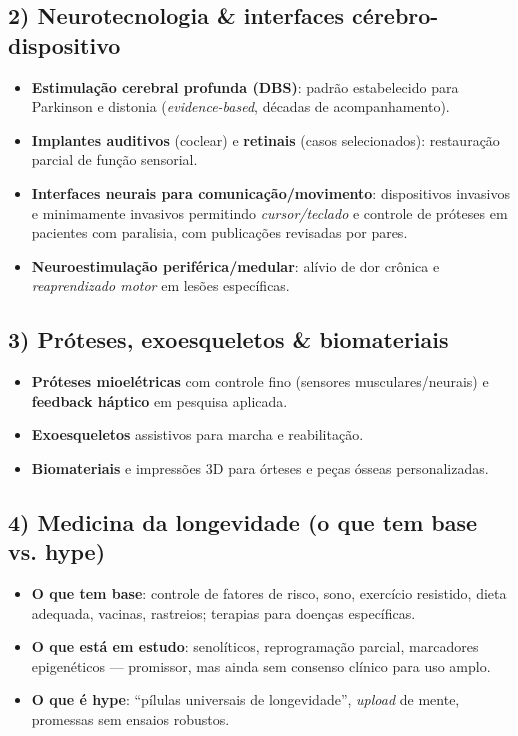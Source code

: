 \subsection*{2) Neurotecnologia \& interfaces cérebro-dispositivo}
\begin{itemize}[leftmargin=*,noitemsep]
  \item \textbf{Estimulação cerebral profunda (DBS)}: padrão estabelecido para Parkinson e distonia (\emph{evidence-based}, décadas de acompanhamento).
  \item \textbf{Implantes auditivos} (coclear) e \textbf{retinais} (casos selecionados): restauração parcial de função sensorial.
  \item \textbf{Interfaces neurais para comunicação/movimento}: dispositivos invasivos e minimamente invasivos permitindo \emph{cursor/teclado} e controle de próteses em pacientes com paralisia, com publicações revisadas por pares.
  \item \textbf{Neuroestimulação periférica/medular}: alívio de dor crônica e \emph{reaprendizado motor} em lesões específicas.
\end{itemize}

\subsection*{3) Próteses, exoesqueletos \& biomateriais}
\begin{itemize}[leftmargin=*,noitemsep]
  \item \textbf{Próteses mioelétricas} com controle fino (sensores musculares/neurais) e \textbf{feedback háptico} em pesquisa aplicada.
  \item \textbf{Exoesqueletos} assistivos para marcha e reabilitação.
  \item \textbf{Biomateriais} e impressões 3D para órteses e peças ósseas personalizadas.
\end{itemize}

\subsection*{4) Medicina da longevidade (o que tem base vs. hype)}
\begin{itemize}[leftmargin=*,noitemsep]
  \item \textbf{O que tem base}: controle de fatores de risco, sono, exercício resistido, dieta adequada, vacinas, rastreios; terapias para doenças específicas.
  \item \textbf{O que está em estudo}: senolíticos, reprogramação parcial, marcadores epigenéticos --- promissor, mas ainda sem consenso clínico para uso amplo.
  \item \textbf{O que é hype}: “pílulas universais de longevidade”, \emph{upload} de mente, promessas sem ensaios robustos.
\end{itemize}

